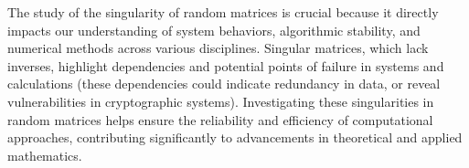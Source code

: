 The study of the singularity of random matrices is crucial because it directly impacts our understanding of system behaviors, algorithmic stability, and numerical methods across various disciplines. 
Singular matrices, which lack inverses, highlight dependencies and potential points of failure in systems and calculations (these dependencies could indicate redundancy in data, or reveal vulnerabilities in cryptographic systems). 
Investigating these singularities in random matrices helps ensure the reliability and efficiency of computational approaches, contributing significantly to advancements in theoretical and applied mathematics.